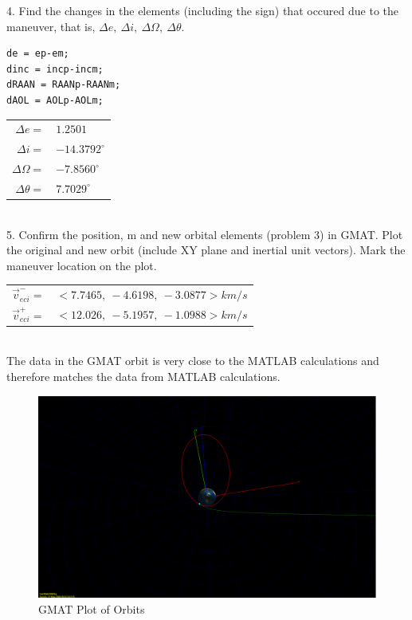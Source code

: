 \documentclass[hidelinks,12pt]{article}
\begin{document}
\vspace{10px}
4. Find the changes in the elements (including the sign) that occured due to the maneuver, that is, $\Delta e,~\Delta i,~\Delta \Omega,~\Delta \theta$.\\
\begin{lstlisting}[frame=lines,style=Matlab-editor,basicstyle = \mlttfamily]
de = ep-em;
dinc = incp-incm;
dRAAN = RAANp-RAANm;
dAOL = AOLp-AOLm;
\end{lstlisting}
\begin{tabular}{rl}
  $\Delta e=$ & $1.2501$\\
  $\Delta i=$ & $-14.3792^\circ$\\
  $\Delta \Omega=$ & $-7.8560^\circ$\\
  $\Delta \theta=$ & $7.7029^\circ$\\
\end{tabular}\\
\vspace{10px}
5. Confirm the position, $ $m and new orbital elements (problem 3) in GMAT. Plot the original and new orbit (include XY plane and inertial unit vectors). Mark the maneuver location on the plot.\\
\begin{tabular}{rl}
  $\vec{v}^-_{eci}=$&$<7.7465,~-4.6198,~-3.0877> km/s$\\
  $\vec{v}^+_{eci}=$&$<12.026,~-5.1957,~-1.0988> km/s$
\end{tabular}\\
The data in the GMAT orbit is very close to the MATLAB calculations and therefore matches the data from MATLAB calculations.\\
\vspace{10px}
\begin{figure}[!htb]
  \center
  \includegraphics[scale=0.2]{GMAT}
  \caption{GMAT Plot of Orbits}
  \label{fig:temp}
\end{figure}
\end{document}
